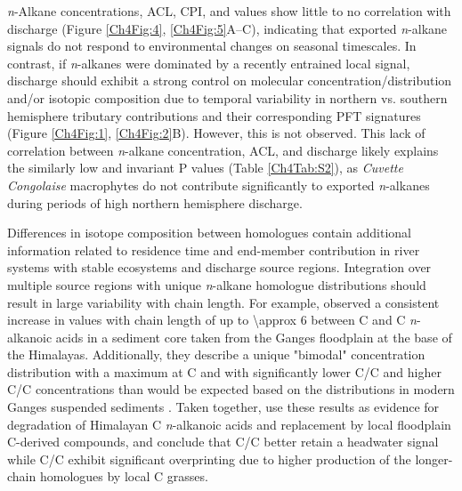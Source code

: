 \textit{n}-Alkane concentrations, ACL, CPI, and  values show little to no correlation with discharge (Figure \ref{Ch4Fig:4}, \ref{Ch4Fig:5}A--C), indicating that exported \textit{n}-alkane signals do not respond to environmental changes on seasonal timescales. In contrast, if \textit{n}-alkanes were dominated by a recently entrained local signal, discharge should exhibit a strong control on molecular concentration/distribution and/or isotopic composition due to temporal variability in northern vs. southern hemisphere tributary contributions and their corresponding PFT signatures (Figure \ref{Ch4Fig:1}, \ref{Ch4Fig:2}B). However, this is not observed. This lack of correlation between \textit{n}-alkane concentration, ACL, and discharge likely explains the similarly low and invariant P values (Table \ref{Ch4Tab:S2}), as \textit{Cuvette Congolaise} macrophytes do not contribute significantly to exported \textit{n}-alkanes during periods of high northern hemisphere discharge.

Differences in isotope composition between homologues contain additional information related to residence time and end-member contribution in river systems with stable ecosystems and discharge source regions. Integration over multiple source regions with unique \textit{n}-alkane homologue distributions should result in large  variability with chain length. For example, \citet{Agrawal:2014fl} observed a consistent increase in  values with chain length of up to \SI{\approx 6}{\permil} between C and C \textit{n}-alkanoic acids in a sediment core taken from the Ganges floodplain at the base of the Himalayas. Additionally, they describe a unique "bimodal" concentration distribution with a maximum at C and with significantly lower C/C and higher C/C concentrations than would be expected based on the distributions in modern Ganges suspended sediments \citep{Galy:2011ix}. Taken together, \citet{Agrawal:2014fl} use these results as evidence for degradation of Himalayan C \textit{n}-alkanoic acids and replacement by local floodplain C-derived compounds, and conclude that C/C better retain a headwater signal while C/C exhibit significant overprinting due to higher production of the longer-chain homologues by local C grasses.

